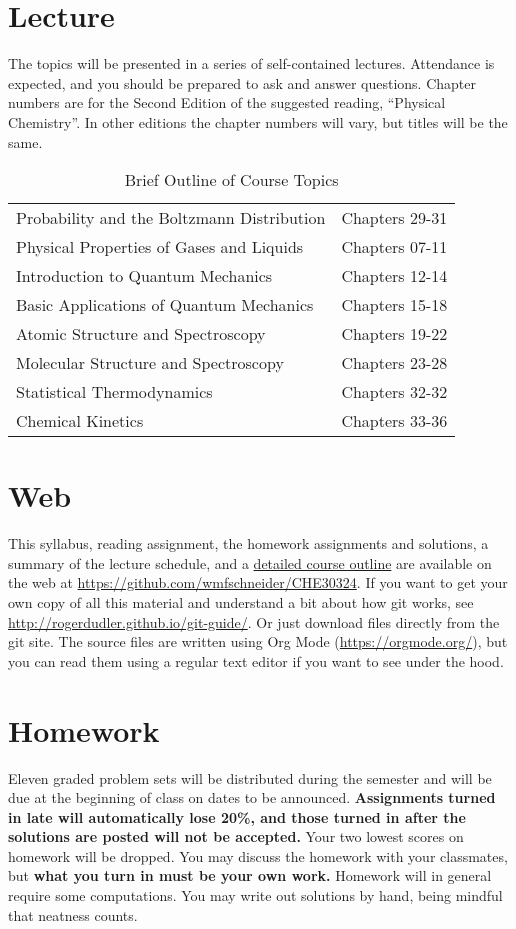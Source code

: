 \documentclass[11pt]{article}
\begin{document}
\section{Lecture}
\label{sec:org737edf7}
The topics will be presented in a series of self-contained lectures. Attendance is expected, and you should be prepared to ask and answer questions. Chapter numbers are for the Second Edition of the suggested reading, ``Physical Chemistry''. In other editions the chapter numbers will vary, but titles will be the same. 

\begin{table}[htbp]
\caption{Brief Outline of Course Topics}
\centering
\begin{tabular}{ll}
\hline
Probability and the Boltzmann Distribution & Chapters 29-31\\
Physical Properties of Gases and Liquids & Chapters 07-11\\
Introduction to Quantum Mechanics & Chapters 12-14\\
Basic Applications of Quantum Mechanics & Chapters 15-18\\
Atomic Structure and Spectroscopy & Chapters 19-22\\
Molecular Structure and Spectroscopy & Chapters 23-28\\
Statistical Thermodynamics & Chapters 32-32\\
Chemical Kinetics & Chapters 33-36\\
\hline
\end{tabular}
\end{table}

\section{Web}
\label{sec:org1e38303}
This syllabus, reading assignment, the homework assignments and solutions, a summary of the lecture schedule, and a \href{https://github.com/wmfschneider/CHE30324/tree/master/Outline/CHE30324-outline.pdf}{detailed course outline} are available on the web at \url{https://github.com/wmfschneider/CHE30324}.  If you want to get your own copy of all this material and understand a bit about how git works, see \url{http://rogerdudler.github.io/git-guide/}.  Or just download files directly from the git site. The source files are written using Org Mode (\url{https://orgmode.org/}), but you can read them using a regular text editor if you want to see under the hood.

\section{Homework}
\label{sec:org49e1422}
Eleven graded problem sets will be distributed during the semester and will be due at the beginning of class on dates to be announced.  \textbf{Assignments turned in late will automatically lose 20\%, and those turned in after the solutions are posted will not be accepted.}  Your two lowest scores on homework will be dropped.  You may discuss the homework with your classmates, but \textbf{what you turn in must be your own work.}
Homework will in general require some computations. You may write out solutions by hand, being mindful that neatness counts. 
\end{document}

